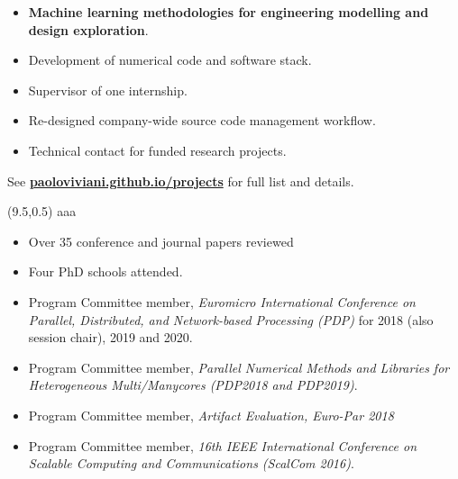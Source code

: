 \documentclass[10pt,a4paper]{altacv}
\begin{document}
\divider

\begin{itemize}
\item \textbf{Machine learning methodologies for engineering modelling and design exploration}.
\item Development of numerical code and software stack.
\item Supervisor of one internship.
\item Re-designed company-wide source code management workflow.
\item Technical contact for funded research projects.
\end{itemize}

\divider

See \href{http://paoloviviani.github.io/projects}{\color{accent}\textbf{paoloviviani.github.io/projects}} for full list and details.
\medskip


\clearpage

\vspace{0.5cm}
\begin{textblock}{10}(9.5,0.5)
  \centering
	aaa
  \vspace{278mm}
\end{textblock}

\renewcommand*{\bibfont}{\small}
\nocite{*}
\medskip
\printbibliography[heading=none]

\divider

\begin{itemize}
\item Over 35 conference and journal papers reviewed
\item Four PhD schools attended.
\item Program Committee member, \textit{Euromicro International Conference on Parallel, Distributed, and Network-based Processing (PDP)} for 2018 (also session chair), 2019 and 2020.
\item Program Committee member, \textit{Parallel Numerical Methods and Libraries for Heterogeneous Multi/Manycores (PDP2018 and PDP2019)}.
\item Program Committee member, \textit{Artifact Evaluation, Euro-Par 2018}
\item Program Committee member, \textit{16th IEEE International Conference on Scalable Computing and Communications (ScalCom 2016)}.
\end{itemize}
\end{document}
